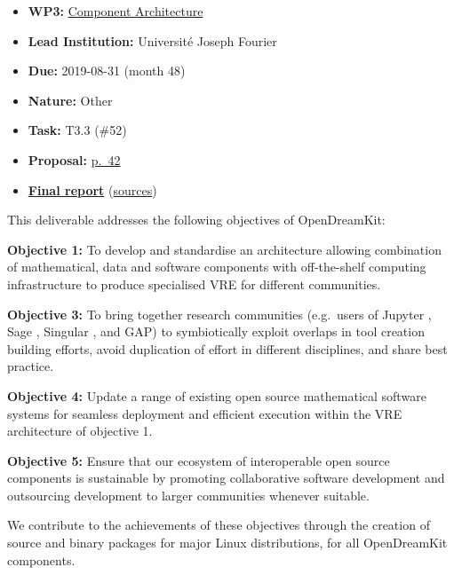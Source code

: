 \begin{itemize}
\tightlist
\item
  \textbf{WP3:}
  \href{https://github.com/OpenDreamKit/OpenDreamKit/tree/master/WP3}{Component
  Architecture}
\item
  \textbf{Lead Institution:} Université Joseph Fourier
\item
  \textbf{Due:} 2019-08-31 (month 48)
\item
  \textbf{Nature:} Other
\item
  \textbf{Task:} T3.3 (\#52)
\item
  \textbf{Proposal:}
  \href{https://github.com/OpenDreamKit/OpenDreamKit/raw/master/Proposal/proposal-www.pdf}{p.~42}
\item
  \textbf{\href{https://github.com/OpenDreamKit/OpenDreamKit/raw/master/WP3/D3.10/report-final.pdf}{Final
  report}}
  (\href{https://github.com/OpenDreamKit/OpenDreamKit/raw/master/WP3/D3.10/}{sources})
\end{itemize}

This deliverable addresses the following objectives of OpenDreamKit:

\textbf{Objective 1:} To develop and standardise an architecture
allowing combination of mathematical, data and software components with
off-the-shelf computing infrastructure to produce specialised VRE for
different communities.

\textbf{Objective 3:} To bring together research communities (e.g.~users
of Jupyter , Sage , Singular , and GAP) to symbiotically exploit
overlaps in tool creation building efforts, avoid duplication of effort
in different disciplines, and share best practice.

\textbf{Objective 4:} Update a range of existing open source
mathematical software systems for seamless deployment and efficient
execution within the VRE architecture of objective 1.

\textbf{Objective 5:} Ensure that our ecosystem of interoperable open
source components is sustainable by promoting collaborative software
development and outsourcing development to larger communities whenever
suitable.

We contribute to the achievements of these objectives through the
creation of source and binary packages for major Linux distributions,
for all OpenDreamKit components.

